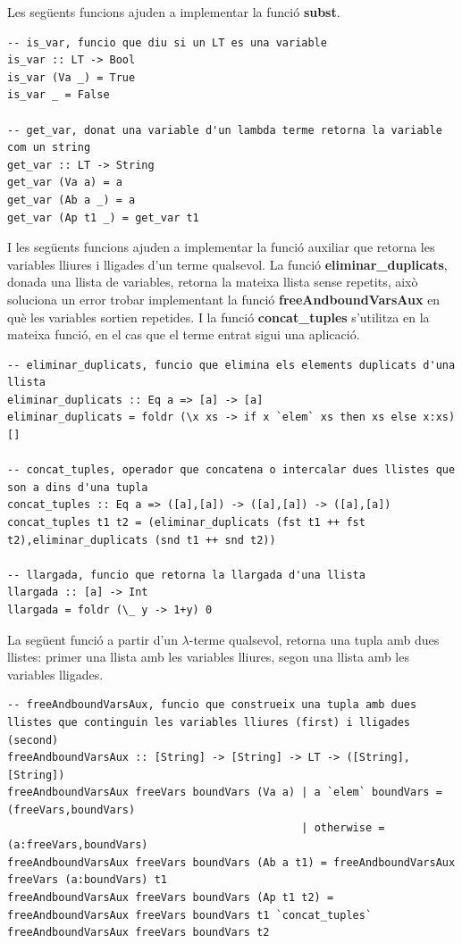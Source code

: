 \documentclass[10pt,a4paper]{article}
\begin{document}
Les següents funcions ajuden a implementar la funció \textbf{subst}.

\lstset{language=Haskell, breaklines=true, basicstyle=\footnotesize}
\begin{lstlisting}[frame=mystyle]
-- is_var, funcio que diu si un LT es una variable
is_var :: LT -> Bool
is_var (Va _) = True
is_var _ = False

-- get_var, donat una variable d'un lambda terme retorna la variable com un string
get_var :: LT -> String
get_var (Va a) = a
get_var (Ab a _) = a
get_var (Ap t1 _) = get_var t1
\end{lstlisting}

I les següents funcions ajuden a implementar la funció auxiliar que retorna les variables lliures i lligades d'un terme qualsevol. La funció \textbf{eliminar\_duplicats}, donada una llista de variables, retorna la mateixa llista sense repetits, això soluciona un error trobar implementant la funció \textbf{freeAndboundVarsAux} en què les variables sortien repetides. I la funció \textbf{concat\_tuples} s'utilitza en la mateixa funció, en el cas que el terme entrat sigui una aplicació.

\lstset{language=Haskell, breaklines=true, basicstyle=\footnotesize}
\begin{lstlisting}[frame=mystyle]
-- eliminar_duplicats, funcio que elimina els elements duplicats d'una llista
eliminar_duplicats :: Eq a => [a] -> [a]
eliminar_duplicats = foldr (\x xs -> if x `elem` xs then xs else x:xs) []

-- concat_tuples, operador que concatena o intercalar dues llistes que son a dins d'una tupla
concat_tuples :: Eq a => ([a],[a]) -> ([a],[a]) -> ([a],[a])
concat_tuples t1 t2 = (eliminar_duplicats (fst t1 ++ fst t2),eliminar_duplicats (snd t1 ++ snd t2))

-- llargada, funcio que retorna la llargada d'una llista
llargada :: [a] -> Int
llargada = foldr (\_ y -> 1+y) 0
\end{lstlisting}

La següent funció a partir d'un $\lambda$-terme qualsevol, retorna una tupla amb dues llistes: primer una llista amb les variables lliures, segon una llista amb les variables lligades.

\lstset{language=Haskell, breaklines=true, basicstyle=\footnotesize}
\begin{lstlisting}[frame=mystyle]
-- freeAndboundVarsAux, funcio que construeix una tupla amb dues llistes que continguin les variables lliures (first) i lligades (second)
freeAndboundVarsAux :: [String] -> [String] -> LT -> ([String],[String])
freeAndboundVarsAux freeVars boundVars (Va a) | a `elem` boundVars = (freeVars,boundVars)
                                              | otherwise = (a:freeVars,boundVars)
freeAndboundVarsAux freeVars boundVars (Ab a t1) = freeAndboundVarsAux freeVars (a:boundVars) t1
freeAndboundVarsAux freeVars boundVars (Ap t1 t2) = freeAndboundVarsAux freeVars boundVars t1 `concat_tuples` freeAndboundVarsAux freeVars boundVars t2
\end{lstlisting}
\end{document}
